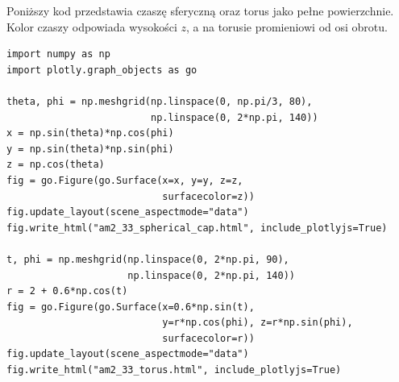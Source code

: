 Poniższy kod przedstawia czaszę sferyczną oraz
torus jako pełne powierzchnie. Kolor czaszy
odpowiada wysokości $z$, a na torusie
promieniowi od osi obrotu.

\begin{lstlisting}[style=python,caption={Czasza sferyczna i torus w Plotly}]
import numpy as np
import plotly.graph_objects as go

theta, phi = np.meshgrid(np.linspace(0, np.pi/3, 80),
                         np.linspace(0, 2*np.pi, 140))
x = np.sin(theta)*np.cos(phi)
y = np.sin(theta)*np.sin(phi)
z = np.cos(theta)
fig = go.Figure(go.Surface(x=x, y=y, z=z,
                           surfacecolor=z))
fig.update_layout(scene_aspectmode="data")
fig.write_html("am2_33_spherical_cap.html", include_plotlyjs=True)

t, phi = np.meshgrid(np.linspace(0, 2*np.pi, 90),
                     np.linspace(0, 2*np.pi, 140))
r = 2 + 0.6*np.cos(t)
fig = go.Figure(go.Surface(x=0.6*np.sin(t),
                           y=r*np.cos(phi), z=r*np.sin(phi),
                           surfacecolor=r))
fig.update_layout(scene_aspectmode="data")
fig.write_html("am2_33_torus.html", include_plotlyjs=True)
\end{lstlisting}
